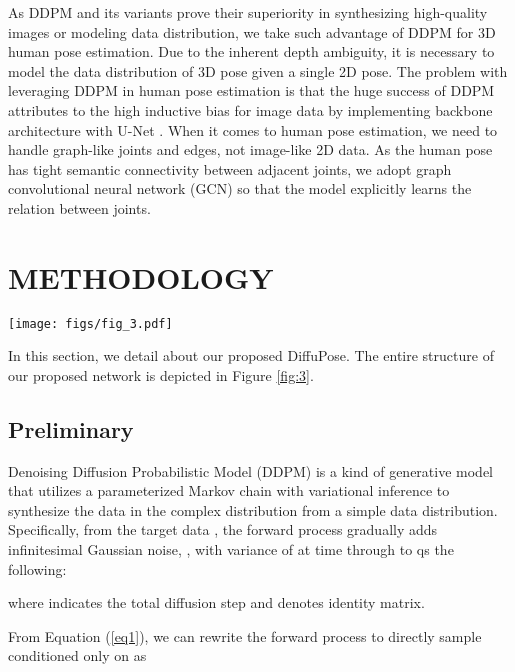 \documentclass[letterpaper, 10 pt, conference]{ieeeconf}
\begin{document}
As DDPM and its variants prove their superiority in synthesizing high-quality images or modeling data distribution, we take such advantage of DDPM for 3D human pose estimation.
Due to the inherent depth ambiguity, it is necessary to model the data distribution of 3D pose given a single 2D pose.
The problem with leveraging DDPM in human pose estimation is that the huge success of DDPM attributes to the high inductive bias for image data by implementing backbone architecture with U-Net \cite{ ho2020denoising, dhariwal2021diffusion}.
When it comes to human pose estimation, we need to handle graph-like joints and edges, not image-like 2D data.
As the human pose has tight semantic connectivity between adjacent joints, we adopt graph convolutional neural network (GCN) \cite{kipf2016semi} so that the model explicitly learns the relation between joints. \section{METHODOLOGY}
\begin{figure*}[t]
    \centering
    \texttt{[image: figs/fig\_3.pdf]}
    \caption{Overview of DiffuPose. 
    A randomly sampled graph with joints  is randomly sampled from Gaussian distribution and fed to the denoising Graph Convolutional Network (CGN) along with the 2D pose detection results.
    After multiple denoising steps, DiffuPose generates stochastic 3D pose outputs which correspond to the 2D pose input.
    }
    \vspace{-10pt}
    \label{fig:3}
\end{figure*}

In this section, we detail about our proposed DiffuPose.
The entire structure of our proposed network is depicted in Figure \ref{fig:3}.
\subsection{Preliminary}
Denoising Diffusion Probabilistic Model (DDPM) \cite{ho2020denoising} is a kind of generative model that utilizes a parameterized Markov chain with variational inference to synthesize the data in the complex distribution from a simple data distribution.
Specifically, from the target data , the forward process  gradually adds infinitesimal Gaussian noise, , with variance of  at time  through  to  qs the following:

where  indicates the total diffusion step and  denotes identity matrix.

From Equation (\ref{eq1}), we can rewrite the forward process to directly sample  conditioned only on  as
\end{document}
